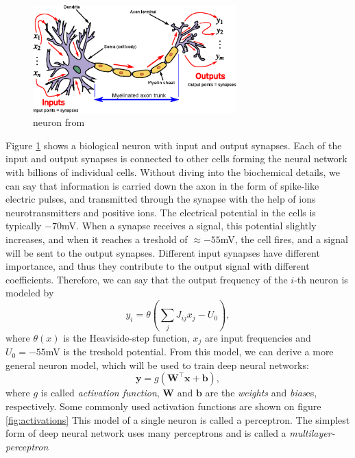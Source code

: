 \documentclass[12pt, a4paper,  nobibnotes]{article}
\begin{document}
\begin{figure}[H]
    \centering
    \includegraphics[width=0.7\textwidth]{figures/Neuron3.eps}
    \caption{neuron from \cite{wikipedianeuron}}
    \label{fig:neuron}
\end{figure}
Figure \ref{fig:neuron} shows a biological neuron with input and output synapses. Each 
of the input and output synapses is connected to other cells forming the neural 
network with billions of individual cells.
Without diving into the biochemical details, we can say that information is carried down the 
axon in the form of spike-like electric pulses, and transmitted through the synapse with 
the help of ions neurotransmitters and positive ions.
The electrical potential in the cells is typically $-70$mV. When a synapse receives a
signal, this potential slightly increases, and when it reaches a treshold of $\approx -55$mV, 
the cell fires, and a signal will be sent to the output synapses. 
Different input synapses have different importance, and thus they contribute to the 
output signal with different coefficients. Therefore, we can say that the output 
frequency of the $i$-th neuron is modeled by
\begin{equation}
    y_i = \theta\left(\sum\limits_j J_{ij}x_j - U_0\right),
\end{equation} 
where $\theta(x)$ is the Heaviside-step function, $x_j$ are input frequencies and $U_0=-55$mV is
the treshold potential.
From this model, we can derive a more general neuron model, which will be used to train 
deep neural networks:
\begin{equation}
    \mathbf y = g\left(\mathbf W^\top\mathbf x + \mathbf b\right),
\end{equation}
where $g$ is called \textit{activation function}, $\mathbf W$ and $\mathbf b$ are the 
\textit{weights} and \textit{bias}es, respectively.
Some commonly used activation functions are shown on figure \ref{fig:activations} This model of a single neuron is called a 
perceptron. 
The simplest form of deep neural network uses many perceptrons and is called a \textit{multilayer-perceptron}
\end{document}
